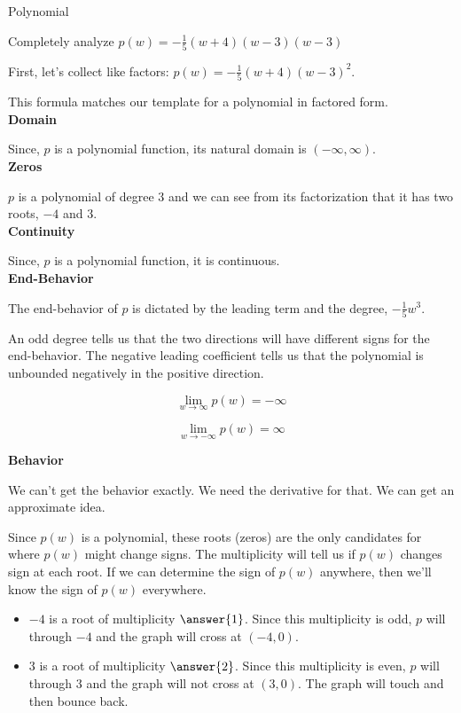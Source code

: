 \documentclass{ximera}
\begin{document}
\begin{example} Polynomial


Completely analyze $p(w) = -\frac{1}{5}(w+4)(w-3)(w-3)$


First, let's collect like factors: $p(w) = -\frac{1}{5}(w+4)(w-3)^2$.


This formula matches our template for a polynomial in factored form. \\

\textbf{Domain}

Since, $p$ is a polynomial function, its natural domain is $(-\infty, \infty)$. \\



\textbf{Zeros}



$p$ is a polynomial of degree $3$ and we can see from its factorization that it has two roots, $-4$ and $3$. \\  




\textbf{Continuity}

Since, $p$ is a polynomial function, it is continuous. \\



\textbf{End-Behavior}


The end-behavior of $p$ is dictated by the leading term and the degree, $-\frac{1}{5} w^3$.  

An odd degree tells us that the two directions will have different signs for the end-behavior.  The negative leading coefficient tells us that the polynomial is unbounded negatively in the positive direction.


\[
\lim\limits_{w \to \infty}p(w) = -\infty
\]


\[
\lim\limits_{w \to -\infty}p(w) = \infty
\] 






\textbf{Behavior}

We can't get the behavior exactly.  We need the derivative for that. We can get an approximate idea.

Since $p(w)$ is a polynomial, these roots (zeros) are the only candidates for where $p(w)$ might change signs.  The multiplicity will tell us if $p(w)$ changes sign at each root. If we can determine the sign of $p(w)$ anywhere, then we'll know the sign of $p(w)$ everywhere.\\

\begin{itemize}
\item $-4$ is a root of multiplicity $\answer{1}$.  Since this multiplicity is odd, $p$ will  through $-4$ and the graph will cross at $(-4,0)$.
\item $3$ is a root of multiplicity $\answer{2}$.  Since this multiplicity is even, $p$ will  through $3$ and the graph will not cross at $(3,0)$.  The graph will touch and then bounce back.
\end{itemize}






\end{example}
\end{document}
